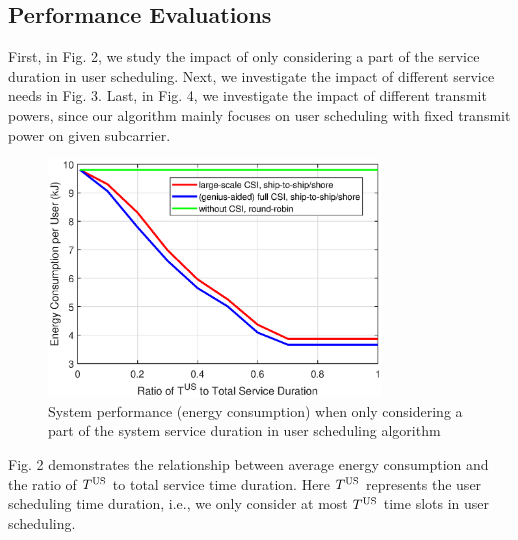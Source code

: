 \documentclass[conference]{IEEEtran}
\begin{document}
 
 \subsection{Performance Evaluations}
 
 First, in Fig. 2, we study the impact of only considering a part of the service duration in user scheduling. 
 Next, we investigate the impact of different service needs in Fig. 3. 
 Last, in Fig. 4, we investigate the impact of different transmit powers, since our algorithm mainly focuses on user scheduling with fixed transmit power on given subcarrier. 
 
 
 \begin{figure} [htb]
 \begin{center}
 \includegraphics*[width=8.8cm]{Tranges.eps}
 \end{center}
 \vspace*{-4mm} 
 \caption{System performance (energy consumption) when only considering a part of the system service duration in user scheduling algorithm} \label{fig:2}
 \vspace*{-2mm} 
 \end{figure}
 
 
 Fig. 2 demonstrates the relationship between average energy consumption and the ratio of ${T^{\rm{US}}}$ to total service time duration. Here ${T^{\rm{US}}}$ represents the user scheduling time duration, i.e., we only consider at most $T^{\rm{US}}$ time slots in user scheduling. %
 
\end{document}
